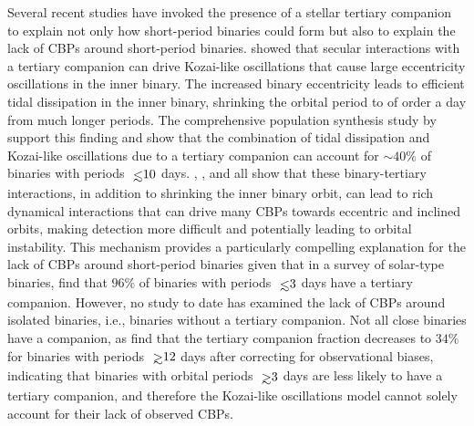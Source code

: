 Several recent studies have invoked the presence of a stellar tertiary companion to explain not only how short-period binaries could form but also to explain the lack of CBPs around short-period binaries. \citet{Fabrycky2007} showed that secular interactions with a tertiary companion can drive Kozai-like oscillations that cause large eccentricity oscillations in the inner binary.  The increased binary eccentricity leads to efficient tidal dissipation in the inner binary, shrinking the orbital period to of order a day from much longer periods. The comprehensive population synthesis study by \citet{Moe2018} support this finding and show that the combination of tidal dissipation and Kozai-like oscillations due to a tertiary companion can account for ${\sim}40\%$ of binaries with periods $\lsim 10$ days.  \citet{Munoz2015}, \citet{Martin2015b}, and \citet{Hamers2016} all show that these binary-tertiary interactions, in addition to shrinking the inner binary orbit, can lead to rich dynamical interactions that can drive many CBPs towards eccentric and inclined orbits, making detection more difficult and potentially leading to orbital instability. This mechanism provides a particularly compelling explanation for the lack of CBPs around short-period binaries given that in a survey of solar-type binaries, \citet{Tokovinin2006} find that $96\%$ of binaries with periods $\lsim 3$ days have a tertiary companion.  However, no study to date has examined the lack of CBPs around isolated binaries, i.e., binaries without a tertiary companion.  Not all close binaries have a companion, as \citet{Tokovinin2006} find that the tertiary companion fraction decreases to $34\%$ for binaries with periods $\gsim 12$ days after correcting for observational biases, indicating that binaries with orbital periods $\gsim 3$ days are less likely to have a tertiary companion, and therefore the Kozai-like oscillations model cannot solely account for their lack of observed CBPs.


